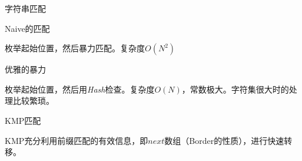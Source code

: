 \documentclass{ctexbeamer}		%
\begin{document}
\begin{frame}{字符串匹配}

\begin{block}{Naive的匹配}

枚举起始位置，然后暴力匹配。复杂度$O(N^2)$

\end{block}
  
\pause

\begin{block}{优雅的暴力}

枚举起始位置，然后用\textit{Hash}检查。复杂度$O(N)$，常数极大。字符集很大时的处理比较繁琐。

\end{block}

\pause

\begin{block}{KMP匹配}
    
KMP充分利用前缀匹配的有效信息，即$next$数组（Border的性质），进行快速转移。

\end{block}

\end{frame}
\end{document}
